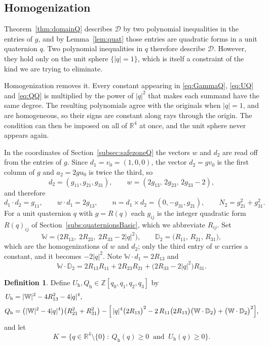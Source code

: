 \documentclass[reqno]{amsart}
\theoremstyle{definition}
\newtheorem{definition}[theorem]{Definition}
\newcommand{\R}{\mathbb{R}}
\newcommand{\Z}{\mathbb{Z}}
\newcommand{\Dom}{\mathcal{D}}
\begin{document}
\subsection{Homogenization}\label{subsec:homogQ}

Theorem~\ref{thm:domainQ} describes $\Dom$ by two polynomial inequalities in the entries of $g$,
and by Lemma~\ref{lem:quat} those entries are quadratic forms in a unit quaternion $q$. Two
polynomial inequalities in $q$ therefore describe $\Dom$. However, they hold only on the unit sphere
$\{|q|=1\}$, which is itself a constraint of the kind we are trying to eliminate.

Homogenization removes it. Every constant appearing in \eqref{eq:GammaQ}, \eqref{eq:UQ} and \eqref{eq:QQ} is
multiplied by the power of $|q|^2$ that makes each summand have the same degree. The resulting
polynomials agree with the originals when $|q|=1$, and are homogeneous, so their signs are
constant along rays through the origin. The condition can then be imposed on all of $\R^4$ at
once, and the unit sphere never appears again.

In the coordinates of Section~\ref{subsec:safezoneQ} the vectors $w$ and $d_2$ are read off from
the entries of $g$. Since $d_1=v_0=(1,0,0)$, the vector $d_2=gv_0$ is the first column of $g$ and
$a_2=2gu_0$ is twice the third, so
\[
d_2=(g_{11},g_{21},g_{31}),\qquad w=(2g_{13},\,2g_{23},\,2g_{33}-2),
\]
and therefore
\[
d_1\cdot d_2=g_{11},\qquad w\cdot d_1=2g_{13},\qquad
n=d_1\times d_2=(0,-g_{31},g_{21}),\qquad N_2=g_{21}^2+g_{31}^2 .
\]
For a unit quaternion $q$ with $g=R(q)$ each $g_{ij}$ is the integer quadratic form $R(q)_{ij}$ of
Section~\ref{subs:quaternionsBasic}, which we abbreviate $R_{ij}$. Set
\[
\mathbb W=\bigl(2R_{13},\;2R_{23},\;2R_{33}-2|q|^2\bigr),
\qquad
\mathbb D_2=\bigl(R_{11},\,R_{21},\,R_{31}\bigr),
\]
which are the homogenizations of $w$ and $d_2$; only the third entry of $w$ carries a constant, and
it becomes $-2|q|^2$. Note $\mathbb W\cdot d_1=2R_{13}$ and
\[
\mathbb W\cdot\mathbb D_2=2R_{13}R_{11}+2R_{23}R_{21}+\bigl(2R_{33}-2|q|^2\bigr)R_{31}.
\]

\begin{definition}\label{def:UhQh}
Define $U_{\mathrm h},Q_{\mathrm h}\in\Z[q_0,q_1,q_2,q_3]$ by
\begin{align*}
U_{\mathrm h}&=|\mathbb W|^2-4R_{13}^2-4|q|^4,\\[2pt]
Q_{\mathrm h}&=\bigl(|\mathbb W|^2-4|q|^4\bigr)\bigl(R_{21}^2+R_{31}^2\bigr)
 -\Bigl[\,|q|^4\bigl(2R_{13}\bigr)^2
   -2\,R_{11}\bigl(2R_{13}\bigr)\bigl(\mathbb W\cdot\mathbb D_2\bigr)
   +\bigl(\mathbb W\cdot\mathbb D_2\bigr)^2\Bigr],
\end{align*}
and let
\[
K=\bigl\{q\in\R^4\setminus\{0\}\ :\ Q_{\mathrm h}(q)\ge0\ \text{ and }\ U_{\mathrm h}(q)\ge0\bigr\}.
\]
\end{definition}
\end{document}
